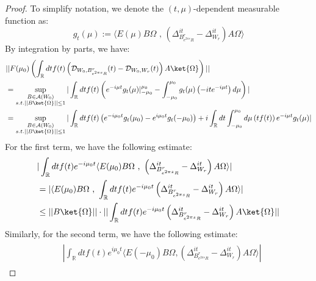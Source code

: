 \documentclass[a4paper,11pt]{article}
\theoremstyle{definition}
\newcommand{\lb}{\left(}
\newcommand{\rb}{\right)}
\begin{document}
\begin{proof}
    To simplify notation, we denote the $(t,\mu)$-dependent measurable function as:
    \begin{equation}
        g_t(\mu) := \langle E(\mu) B\Omega\text{ , }\lb\Delta^{it}_{B^r_{e^{2\pi s}R}} - \Delta^{it}_{W_r}\rb A\Omega\rangle
    \end{equation}
    By integration by parts, we have:
    \begin{align}
        \begin{split}
            &||F(\mu_0)\lb\int_\mathbb{R} dt f(t)\lb\mathcal{D}_{W_0, B^r_{e^{2\pi s}R}}(t) - \mathcal{D}_{W_0, W_r}(t)\rb A\ket{\Omega}\rb||
            \\&
            =\sup_{\substack{B\in\mathcal{A}(W_0)\\s.t.||B\ket{\Omega}||\leq 1}}|\int_\mathbb{R}dt f(t)\lb e^{-i\mu t}g_t(\mu)|_{-\mu_0}^{\mu_0} - \int_{-\mu_0}^{\mu_0}g_t(\mu)\lb-ite^{-i\mu t}\rb d\mu \rb|
            \\&
            =\sup_{\substack{B\in\mathcal{A}(W_0)\\s.t.||B\ket{\Omega}||\leq 1}}|\int_\mathbb{R} dt f(t) \lb e^{-i\mu_0 t}g_t(\mu_0)- e^{i\mu_0 t}g_t(-\mu_0)\rb + i\int_\mathbb{R} dt \int_{-\mu_0}^{\mu_0} d\mu \lb tf(t)\rb e^{-i\mu t} g_t(\mu)|
        \end{split}
    \end{align}
    For the first term, we have the following estimate:
    \begin{align}
        \begin{split}
            &|\int_\mathbb{R} dt f(t)e^{-i\mu_0 t}\langle E(\mu_0) B\Omega\text{ , }\lb\Delta^{it}_{B^r_{e^{2\pi s}R}} - \Delta^{it}_{W_r}\rb A\Omega\rangle|
            \\&
            =|\langle E(\mu_0)B\Omega\text{ , }\int_\mathbb{R}dt f(t)e^{-i\mu_0 t}\lb\Delta^{it}_{B^r_{e^{2\pi s}R}} - \Delta^{it}_{W_r}\rb A\Omega\rangle|
            \\&
            \leq ||B\ket{\Omega}||\cdot||\int_\mathbb{R} dt f(t) e^{-i\mu_0 t}\lb\Delta^{it}_{B^r_{e^{2\pi s}R}} - \Delta^{it}_{W_r}\rb A\ket{\Omega}||
        \end{split}
    \end{align}
    Similarly, for the second term, we have the following estimate:
    \begin{align}
        \begin{split}
            &|\int_\mathbb{R} dt f(t) e^{i\mu_0 t}\langle E(-\mu_0)B\Omega, \lb \Delta^{it}_{B^r_{e^{2\pi s}R}} - \Delta^{it}_{W_r} \rb A \Omega\rangle|

\end{split}
\end{align}
\end{proof}
\end{document}
